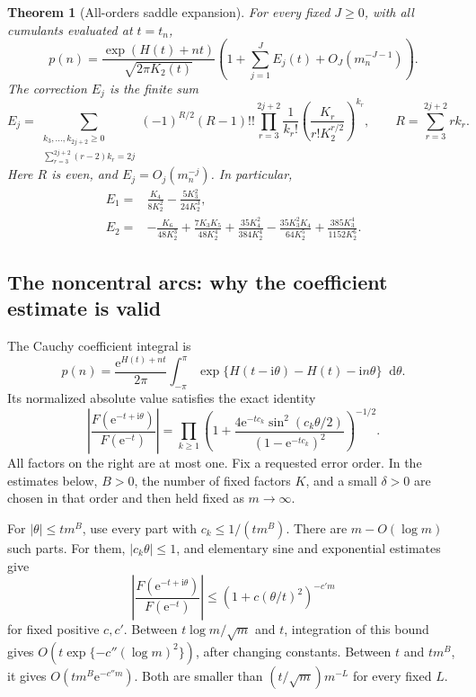 \documentclass[11pt,a4paper]{article}
\numberwithin{equation}{section}
\newtheorem{theorem}{Theorem}[section]
\theoremstyle{definition}
\theoremstyle{remark}
\newcommand{\ii}{\mathrm i}
\newcommand{\e}{\mathrm e}
\newcommand{\dd}{\mathop{}\!\mathrm d}
\begin{document}
\begin{theorem}[All-orders saddle expansion]\label{ctp:thm:saddle}
For every fixed $J\geq0$, with all cumulants evaluated at $t=t_n$,
\begin{equation}\label{ctp:eq:saddle-expansion}
 p(n)=\frac{\exp(H(t)+nt)}{\sqrt{2\pi K_2(t)}}
 \left(1+\sum_{j=1}^J E_j(t)+O_J(m_n^{-J-1})\right).
\end{equation}
The correction $E_j$ is the finite sum
\begin{equation}\label{ctp:eq:Ej}
 E_j=\sum_{\substack{k_3,\ldots,k_{2j+2}\geq0\\
                   \sum_{r=3}^{2j+2}(r-2)k_r=2j}}
 (-1)^{R/2}(R-1)!!
 \prod_{r=3}^{2j+2}\frac1{k_r!}
 \left(\frac{K_r}{r!K_2^{r/2}}\right)^{k_r},
 \qquad R=\sum_{r=3}^{2j+2}rk_r.
\end{equation}
Here $R$ is even, and $E_j=O_j(m_n^{-j})$. In particular,
\begin{align}
 E_1={}&\frac{K_4}{8K_2^2}-\frac{5K_3^2}{24K_2^3},\label{ctp:eq:E1}\\
 E_2={}&-\frac{K_6}{48K_2^3}+\frac{7K_3K_5}{48K_2^4}
 +\frac{35K_4^2}{384K_2^4}-\frac{35K_3^2K_4}{64K_2^5}
 +\frac{385K_3^4}{1152K_2^6}.\label{ctp:eq:E2}
\end{align}
\end{theorem}

\subsection{The noncentral arcs: why the coefficient estimate is valid}
The Cauchy coefficient integral is
\begin{equation}\label{ctp:eq:cauchy}
 p(n)=\frac{\e^{H(t)+nt}}{2\pi}
 \int_{-\pi}^{\pi}
 \exp\{H(t-\ii\theta)-H(t)-\ii n\theta\}\dd\theta.
\end{equation}
Its normalized absolute value satisfies the exact identity
\begin{equation}\label{ctp:eq:modulus}
 \left|\frac{F(\e^{-t+\ii\theta})}{F(\e^{-t})}\right|
 =\prod_{k\geq1}
 \left(1+\frac{4\e^{-tc_k}\sin^2(c_k\theta/2)}
 {(1-\e^{-tc_k})^2}\right)^{-1/2}.
\end{equation}
All factors on the right are at most one.
Fix a requested error order. In the estimates below, $B>0$, the number of
fixed factors $K$, and a small $\delta>0$ are chosen in that order and then
held fixed as $m\to\infty$.

For $|\theta|\leq tm^B$, use every part with $c_k\leq1/(tm^B)$.
There are $m-O(\log m)$ such parts. For them,
$|c_k\theta|\leq1$, and elementary sine and exponential estimates give
\begin{equation}\label{ctp:eq:central-tail-bound}
 \left|\frac{F(\e^{-t+\ii\theta})}{F(\e^{-t})}\right|
 \leq\left(1+c(\theta/t)^2\right)^{-c'm}
\end{equation}
for fixed positive $c,c'$. Between
$t\log m/\sqrt m$ and $t$, integration of this bound gives
$O(t\exp\{-c''(\log m)^2\})$, after changing constants. Between $t$ and
$tm^B$, it gives $O(tm^B\e^{-c''m})$.
Both are smaller than $(t/\sqrt m)m^{-L}$ for every fixed $L$.
\end{document}
